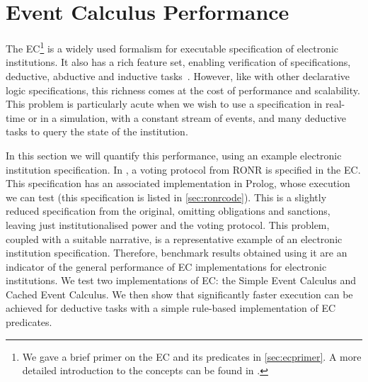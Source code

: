 



\section{Event Calculus Performance}\label{sec:ecperf}

The \acl{EC}\footnote{We gave a brief primer on the \ac{EC} and its predicates in \autoref{sec:ecprimer}. A more detailed introduction to the concepts can be found in \citet{Shanahan1999}.} is a widely used formalism for executable specification of electronic
institutions. It also has a rich feature
set, enabling verification of specifications, deductive, abductive and
inductive tasks~\citep{Shanahan1999}. However, like with other declarative
logic specifications, this richness comes at the cost of performance and
scalability. This problem is particularly acute when we wish to use a
specification in real-time or in a simulation, with a constant stream of events,
and many deductive tasks to query the state of the institution.

In this section we will quantify this performance, using an example electronic
institution specification. In \citet{Pitt2005a}, a voting protocol from
\ac{RONR} is specified in the \ac{EC}. This specification has an associated
implementation in Prolog, whose execution we can test (this specification is
listed in \autoref{sec:ronrcode}). This is a slightly reduced specification
from the original, omitting obligations and sanctions, leaving just
institutionalised power and the voting protocol. This problem, coupled with a
suitable narrative, is a representative example of an electronic institution
specification. Therefore, benchmark results obtained using it are an indicator of the
general performance of \ac{EC} implementations for electronic institutions. We
test two implementations of \ac{EC}: the Simple Event Calculus and Cached
Event Calculus. We then show that significantly faster execution can be
achieved for deductive tasks with a simple rule-based implementation of
\ac{EC} predicates.

